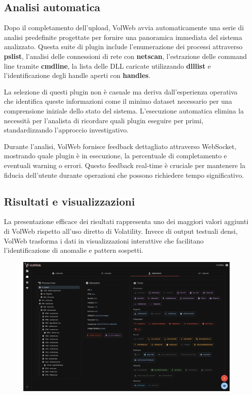 \subsection{Analisi automatica}

Dopo il completamento dell'upload, VolWeb avvia automaticamente una serie di analisi predefinite progettate per fornire una panoramica immediata del sistema analizzato. Questa suite di plugin include l'enumerazione dei processi attraverso \textbf{pslist}, l'analisi delle connessioni di rete con \textbf{netscan}, l'estrazione delle command line tramite \textbf{cmdline}, la lista delle DLL caricate utilizzando \textbf{dlllist} e l'identificazione degli handle aperti con \textbf{handles}.

La selezione di questi plugin non è casuale ma deriva dall'esperienza operativa che identifica queste informazioni come il minimo dataset necessario per una comprensione iniziale dello stato del sistema. L'esecuzione automatica elimina la necessità per l'analista di ricordare quali plugin eseguire per primi, standardizzando l'approccio investigativo.

Durante l'analisi, VolWeb fornisce feedback dettagliato attraverso WebSocket, mostrando quale plugin è in esecuzione, la percentuale di completamento e eventuali warning o errori. Questo feedback real-time è cruciale per mantenere la fiducia dell'utente durante operazioni che possono richiedere tempo significativo.

\subsection{Risultati e visualizzazioni}

La presentazione efficace dei risultati rappresenta uno dei maggiori valori aggiunti di VolWeb rispetto all'uso diretto di Volatility. Invece di output testuali densi, VolWeb trasforma i dati in visualizzazioni interattive che facilitano l'identificazione di anomalie e pattern sospetti.

\begin{figure}[H]
    \centering
    \includegraphics[width=1\linewidth]{images/volweb-original/volweb-process-tree.png}
\end{figure}


